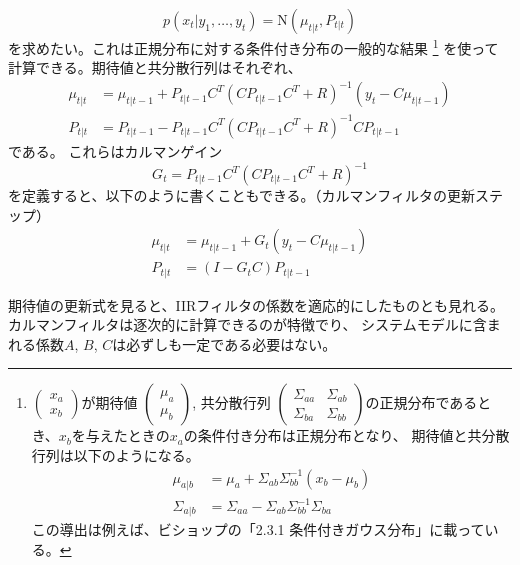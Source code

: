\documentclass[textwidth-limit=45]{bxjsarticle}
\begin{document}
\begin{equation}
  p(x_{t}|y_1, \dots, y_{t}) = \mathrm N(\mu_{t|t}, P_{t|t})
\end{equation}
を求めたい。これは正規分布に対する条件付き分布の一般的な結果
\footnote{
  $\begin{pmatrix}
    x_{a} \\
    x_{b}
  \end{pmatrix}
  $が期待値
  $\begin{pmatrix}
    \mu_{a} \\
    \mu_{b}
  \end{pmatrix}
  $, 共分散行列
  $\begin{pmatrix}
    \Sigma_{aa} & \Sigma_{ab} \\
    \Sigma_{ba} & \Sigma_{bb}
  \end{pmatrix}
  $の正規分布であるとき、$x_b$を与えたときの$x_a$の条件付き分布は正規分布となり、
  期待値と共分散行列は以下のようになる。
  \begin{align}
    \mu_{a|b} &= \mu_{a} + \Sigma_{ab} \Sigma_{bb}^{-1} (x_b - \mu_{b}) \\
    \Sigma_{a|b} &= \Sigma_{aa} - \Sigma_{ab} \Sigma_{bb}^{-1} \Sigma_{ba}
  \end{align}
  この導出は例えば、ビショップの「2.3.1 条件付きガウス分布」に載っている。
}
を使って計算できる。期待値と共分散行列はそれぞれ、
\begin{align}
  \mu_{t|t} &= \mu_{t|t-1} + P_{t|t-1}C^T (C P_{t|t-1} C^T + R)^{-1} (y_t - C\mu_{t|t-1})  \\
  P_{t|t} &= P_{t|t-1} - P_{t|t-1} C^T (C P_{t|t-1} C^T + R)^{-1} C P_{t|t-1}
\end{align}
である。
これらはカルマンゲイン
\begin{equation}
  G_t = P_{t|t-1} C^T (C P_{t|t-1} C^T + R)^{-1}
\end{equation}
を定義すると、以下のように書くこともできる。（カルマンフィルタの更新ステップ）
\begin{align}
  \mu_{t|t} &= \mu_{t|t-1} + G_t (y_t - C\mu_{t|t-1})  \\
  P_{t|t} &= (I- G_t C) P_{t|t-1}
\end{align}

期待値の更新式を見ると、IIRフィルタの係数を適応的にしたものとも見れる。
カルマンフィルタは逐次的に計算できるのが特徴でり、
システムモデルに含まれる係数$A$, $B$, $C$は必ずしも一定である必要はない。
\end{document}
